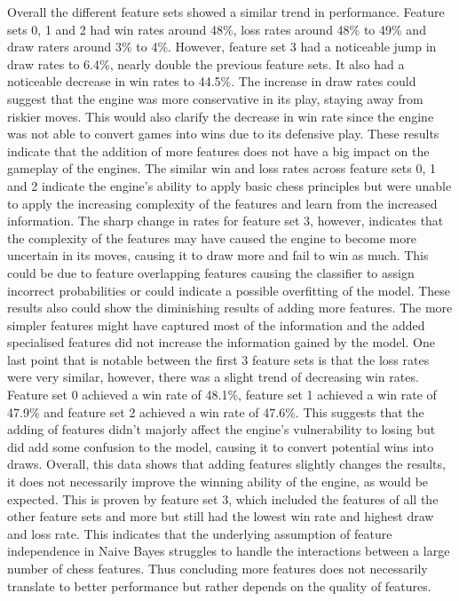 




Overall the different feature sets showed a similar trend in performance. Feature sets 0, 1 and 2 had win rates around 48\%, loss rates around 48\% to 49\% and draw raters around 3\% to 4\%. However, feature set 3 had a noticeable jump in draw rates to 6.4\%, nearly double the previous feature sets. It also had a noticeable decrease in win rates to 44.5\%. The increase in draw rates could suggest that the engine was more conservative in its play, staying away from riskier moves. This would also clarify the decrease in win rate since the engine was not able to convert games into wins due to its defensive play. These results indicate that the addition of more features does not have a big impact on the gameplay of the engines. The similar win and loss rates across feature sets 0, 1 and 2 indicate the engine's ability to apply basic chess principles but were unable to apply the increasing complexity of the features and learn from the increased information. The sharp change in rates for feature set 3, however, indicates that the complexity of the features may have caused the engine to become more uncertain in its moves, causing it to draw more and fail to win as much. This could be due to feature overlapping features causing the classifier to assign incorrect probabilities \cite{ahmedOkNBEnhancedOPTICS2024} or could indicate a possible overfitting of the model. These results also could show the diminishing results of adding more features. The more simpler features might have captured most of the information and the added specialised features did not increase the information gained by the model. One last point that is notable between the first 3 feature sets is that the loss rates were very similar, however, there was a slight trend of decreasing win rates. Feature set 0 achieved a win rate of 48.1\%, feature set 1 achieved a win rate of 47.9\% and feature set 2 achieved a win rate of 47.6\%. This suggests that the adding of features didn't majorly affect the engine's vulnerability to losing but did add some confusion to the model, causing it to convert potential wins into draws. Overall, this data shows that adding features slightly changes the results, it does not necessarily improve the winning ability of the engine, as would be expected. This is proven by feature set 3, which included the features of all the other feature sets and more but still had the lowest win rate and highest draw and loss rate. This indicates that the underlying assumption of feature independence in Naive Bayes struggles to handle the interactions between a large number of chess features. Thus concluding more features does not necessarily translate to better performance but rather depends on the quality of features. 

